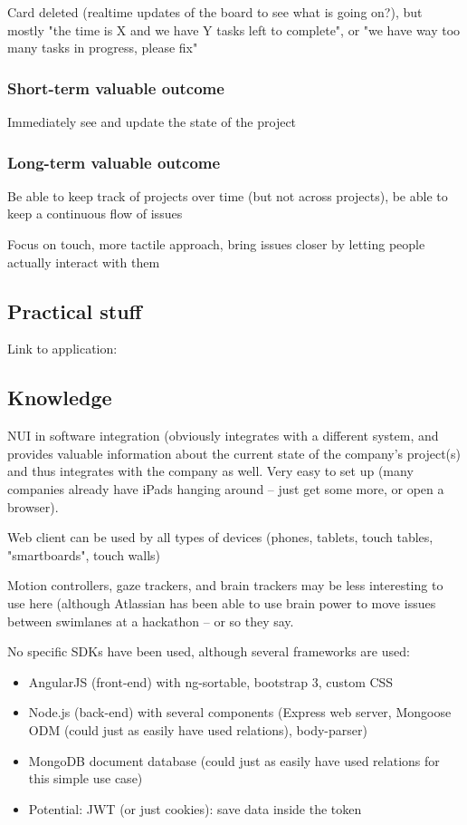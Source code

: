 Card deleted (realtime updates of the board to see what is going on?), but mostly "the time is X and we have Y tasks left to complete", or "we have way too many tasks in progress, please fix"


\subsubsection{Short-term valuable outcome}

Immediately see and update the state of the project

\subsubsection{Long-term valuable outcome}

Be able to keep track of projects over time (but not across projects), be able to keep a continuous flow of issues %

Focus on touch, more tactile approach, bring issues closer by letting people actually interact with them

\subsection{Practical stuff}

Link to application: %

\subsection{Knowledge}

NUI in software integration (obviously integrates with a different system, and provides valuable information about the current state of the company's project(s) and thus integrates with the company as well. Very easy to set up (many companies already have iPads hanging around – just get some more, or open a browser).

Web client can be used by all types of devices (phones, tablets, touch tables, "smartboards", touch walls)

Motion controllers, gaze trackers, and brain trackers may be less interesting to use here (although Atlassian has been able to use brain power to move issues between swimlanes at a hackathon – or so they say.

No specific SDKs have been used, although several frameworks are used:
\begin{itemize}
  \item AngularJS (front-end) with ng-sortable, bootstrap 3, custom CSS
  \item Node.js (back-end) with several components (Express web server, Mongoose ODM (could just as easily have used relations), body-parser)
  \item MongoDB document database (could just as easily have used relations for this simple use case)
  \item Potential: JWT (or just cookies): save data inside the token
\end{itemize}

